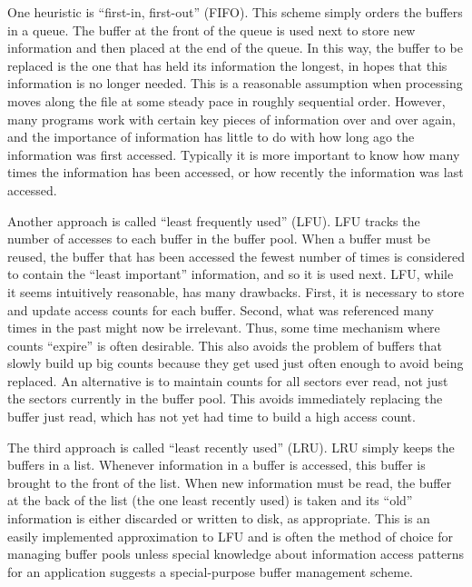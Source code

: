 One heuristic is ``first-in, first-out'' (FIFO).
This scheme simply orders the buffers in a queue.
The buffer at the front of the queue is used next to store new
information and then placed at the end of the queue.
In this way, the buffer to be replaced is the one that has held its
information the longest, in hopes that this information is no longer
needed.
This is a reasonable assumption when processing moves along the file
at some steady pace in roughly sequential order.
However, many programs work with certain key pieces of
information over and over again, and the importance of information has
little to do with how long ago the information was first accessed.
Typically it is more important to know how many times the information
has been accessed, or how recently the information was last accessed.

Another approach is called ``least frequently used'' (LFU).
LFU tracks the number of accesses to each buffer in the
buffer pool.
When a buffer must be reused, the buffer that
has been accessed the fewest number of times is considered to contain
the ``least important'' information, and so it is used next.
LFU, while it seems intuitively reasonable, has many drawbacks.
First, it is necessary to store and update access counts for each buffer.
Second, what was referenced many times in the past might now be
irrelevant.
Thus, some time mechanism where counts ``expire'' is often desirable.
This also avoids the problem of buffers that slowly build up big
counts because they get used just often enough to avoid being
replaced.
An alternative is to maintain counts for all sectors ever read, not
just the sectors currently in the buffer pool.
This avoids immediately replacing the buffer just read, which has not
yet had time to build a high access count.

The third approach is called ``least recently used''
(LRU).
LRU simply keeps the buffers in a list.
Whenever information in a buffer is accessed, this buffer is brought
to the front of the list.
When new information must be read, the buffer at the back of the
list (the one least recently used) is taken and its ``old''
information is either discarded or written to disk, as appropriate.
This is an easily implemented approximation to LFU and is often the
method of choice for managing buffer pools unless
special knowledge about information access patterns for an application
suggests a special-purpose buffer management scheme.

